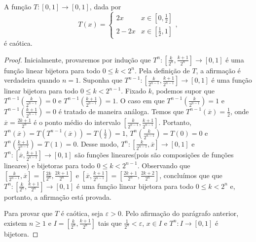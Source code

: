 
\begin{lemma}
\label{lema conjugacaotopologica 1}
A função $T: [0,1] \to [0,1]$, dada por
\[ T(x) =
  \begin{cases}
    2x & x \in \left[ 0, \frac{1}{2} \right] \\
    2 - 2x & x \in \left[ \frac{1}{2}, 1 \right] 
  \end{cases},
\]
é caótica.
\end{lemma}

\begin{proof}
Inicialmente, provaremos por indução que $T^n: \left[\frac{k}{2^n}, \frac{k+1}{2^n}\right] \to [0,1]$ é uma função linear bijetora para todo $0 \leq k  < 2^n$. Pela definição de $T$, a afirmação é verdadeira quando $n = 1$. Suponha que $T^{n-1}: \left[\frac{k}{2^{n-1}}, \frac{k+1}{2^{n-1}}\right] \to [0,1]$ é uma função linear bijetora para todo $0 \leq k < 2^{n-1}$. Fixado $k$, podemos supor que $T^{n-1}\left(\frac{k}{2^{n-1}}\right) = 0$ e $T^{n-1}\left(\frac{k+1}{2^{n-1}}\right) = 1$. O caso em que $T^{n-1}\left(\frac{k}{2^{n-1}}\right) = 1$ e $T^{n-1}\left(\frac{k+1}{2^{n-1}}\right) = 0$ é tratado de maneira análoga. Temos que $T^{n-1}(\overline{x}) = \frac{1}{2}$, onde $\overline{x} = \frac{2k+1}{2^n}$ é o ponto médio do intervalo $\left[\frac{k}{2^{n-1}}, \frac{k+1}{2^{n-1}}\right]$. Portanto, $T^n(\overline{x}) = T(T^{n-1}(\overline{x})) = T\left(\frac{1}{2}\right) = 1$, $T^n\left(\frac{k}{2^{n-1}}\right) = T(0) = 0$ e $T^n\left(\frac{k+1}{2^{n-1}}\right) = T(1) = 0$. Desse modo, $T^n: \left[\frac{k}{2^{n-1}}, \overline{x}\right] \to [0,1]$ e $T^n: \left[\overline{x}, \frac{k+1}{2^{n-1}}\right] \to [0,1]$ são funções lineares(pois são composições de funções lineares) e bijetoras para todo $0 \leq k < 2^{n-1}$. Observando que $\left[\frac{k}{2^{n-1}}, \overline{x}\right] =  \left[\frac{2k}{2^n}, \frac{2k+1}{2^n}\right]$ e $\left[\overline{x}, \frac{k+1}{2^{n-1}}\right] =  \left[\frac{2k+1}{2^n}, \frac{2k+2}{2^n}\right]$, concluímos que  que $T^n: \left[\frac{k}{2^n}, \frac{k+1}{2^n}\right] \to [0,1]$ é uma função linear bijetora para todo $0 \leq k  < 2^n$ e, portanto, a afirmação está provada.

Para provar que $T$ é caótica, seja $\varepsilon > 0$. Pelo afirmação do parágrafo anterior, existem $n \geq 1$ e $I = \left[\frac{k}{2^n}, \frac{k+1}{2^n}\right]$  tais que $\frac{1}{2^n} < \varepsilon$, $x \in I$ e $T^n: I \to [0,1]$ é bijetora.


\end{proof}
